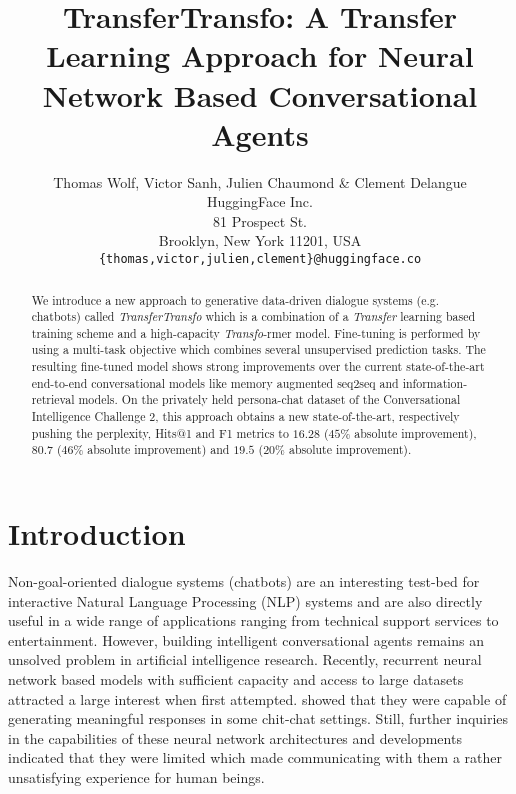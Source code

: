 \documentclass[letterpaper]{article} \usepackage{aaai19}  \usepackage{times}  \usepackage{helvet}  \usepackage{courier}  \usepackage{url}  \usepackage{graphicx}  \usepackage{natbib}
\begin{document}
\title{TransferTransfo: A Transfer Learning Approach for Neural Network Based Conversational Agents}
\author{Thomas Wolf, Victor Sanh, Julien Chaumond \& Clement Delangue \\
HuggingFace  Inc.\\
81 Prospect St.\\
Brooklyn, New York 11201, USA\\
{\tt \{thomas,victor,julien,clement\}@huggingface.co} \\}

\maketitle
\begin{abstract}
  We introduce a new approach to generative data-driven dialogue systems (e.g. chatbots) called \textit{TransferTransfo} which is a combination of a \textit{Transfer} learning based training scheme and a high-capacity \textit{Transfo}-rmer model. Fine-tuning is performed by using a multi-task objective which combines several unsupervised prediction tasks. The resulting fine-tuned model shows strong improvements over the current state-of-the-art end-to-end conversational models like memory augmented seq2seq and information-retrieval models. On the privately held {\sc persona-chat} dataset of the Conversational Intelligence Challenge 2, this approach obtains a new state-of-the-art, respectively pushing the perplexity, Hits@1 and F1 metrics to $16.28$ ($45\%$ absolute improvement), $80.7$ ($46\%$ absolute improvement) and $19.5$ ($20\%$ absolute improvement).
\end{abstract}

\section{Introduction}

Non-goal-oriented dialogue systems (chatbots) are an interesting test-bed for interactive Natural Language Processing (NLP) systems and are also directly useful in a wide range of applications ranging from technical support services to entertainment. However, building intelligent conversational agents remains an unsolved problem in artificial intelligence research. Recently, recurrent neural network based models with sufficient capacity and access to large datasets attracted a large interest when first attempted. \citet{vinyals_neural_2015} showed that they were capable of generating meaningful responses in some chit-chat settings. Still, further inquiries in the capabilities of these neural network architectures and developments \citep{serban_hierarchical_2016,miao_neural_2015,sordoni_hierarchical_2015,serban_deep_2017,li_simple_2016,li_adversarial_2017} indicated that they were limited which made communicating with them a rather unsatisfying experience for human beings.
\end{document}
